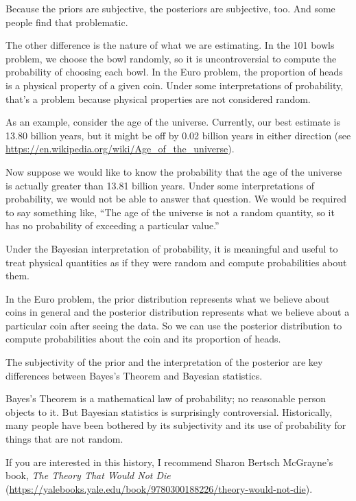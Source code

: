 \documentclass[12pt]{book}
\theoremstyle{exercise}
\begin{document}
Because the priors are subjective, the posteriors are subjective, too.
And some people find that problematic.

The other difference is the nature of what we are estimating.
In the 101 bowls problem, we choose the bowl randomly, so it is uncontroversial to compute the probability of choosing each bowl.
In the Euro problem, the proportion of heads is a physical property of a given coin.
Under some interpretations of probability, that's a problem because physical properties are not considered random.

As an example, consider the age of the universe.
Currently, our best estimate is 13.80 billion years, but it might be off by 0.02 billion years in either direction (see \url{https://en.wikipedia.org/wiki/Age_of_the_universe}).

Now suppose we would like to know the probability that the age of the universe is actually greater than 13.81 billion years.
Under some interpretations of probability, we would not be able to answer that question.
We would be required to say something like, ``The age of the universe is not a random quantity, so it has no probability of exceeding a particular value.''

Under the Bayesian interpretation of probability, it is meaningful and useful to treat physical quantities as if they were random and compute probabilities about them.

In the Euro problem, the prior distribution represents what we believe about coins in general and the posterior distribution represents what we believe about a particular coin after seeing the data.
So we can use the posterior distribution to compute probabilities about the coin and its proportion of heads.

The subjectivity of the prior and the interpretation of the posterior are key differences between Bayes's Theorem and Bayesian statistics.

Bayes's Theorem is a mathematical law of probability; no reasonable person objects to it.
But Bayesian statistics is surprisingly controversial.
Historically, many people have been bothered by its subjectivity and its use of probability for things that are not random.

If you are interested in this history, I recommend Sharon Bertsch McGrayne's book, {\it The Theory That Would Not Die} (\url{https://yalebooks.yale.edu/book/9780300188226/theory-would-not-die}).

\end{document}
